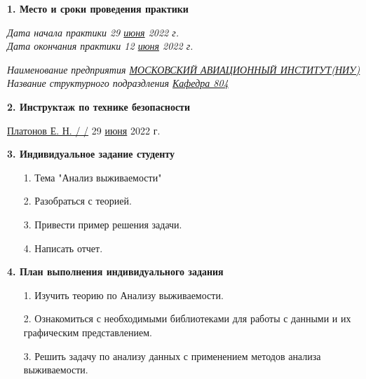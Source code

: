 \textbf{1. Место и сроки проведения практики}

\vspace{20pt}

{\em Дата начала практики \hspace{3cm} 29 \underline{июня} 2022 г.} \\

{\em Дата окончания практики \hspace{3cm} 12 \underline{июня} 2022 г.}

\vspace{20pt}

{\em Наименование предприятия \underline{МОСКОВСКИЙ АВИАЦИОННЫЙ ИНСТИТУТ(НИУ)}} \\

{\em Название структурного подраздления \underline{Кафедра 804}}

\vspace{20pt}

\textbf{2. Инструктаж по технике безопасности}

\vspace{10pt}

\underline{ Платонов Е. Н. / \hspace{3cm} /} \hspace{1cm} 29 \underline{июня} 2022 г.

\vspace{10pt}

\textbf{3. Индивидуальное задание студенту}

\begin{itemize}
    \item[1.] Тема "Анализ выживаемости"
    \item[2.] Разобраться с теорией. 
    \item[3.] Привести пример решения задачи. 
    \item[4.] Написать отчет.
\end{itemize}

\vspace{10pt}
\pagebreak

\textbf{4. План выполнения индивидуального задания}

\begin{itemize}
    \item[1.] Изучить теорию по Анализу выживаемости.
    \item[2.] Ознакомиться с необходимыми библиотеками для работы с данными и их графическим представлением.
    \item[3.] Решить задачу по анализу данных с применением методов анализа выживаемости.
\end{itemize}

